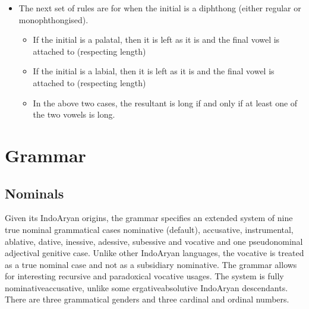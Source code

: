 \documentclass[14pt,oneside]{book}
\let\b\undefined
\newcommand{\b}[1]{{\brahmifont #1}}
\begin{document}
\begin{itemize}
\begin{itemize}
        \end{itemize}

    \item The next set of rules are for when the initial is a diphthong (either regular or monophthongised).

        \begin{itemize}
            
            \item If the initial is a palatal, then it is left as it is and the final vowel is attached to \b{𑀬𑁆} (respecting length)

            \item If the initial is a labial, then it is left as it is and the final vowel is attached to \b{𑀯𑁆} (respecting length)

            \item In the above two cases, the resultant is long if and only if at least one of the two vowels is long.

        \end{itemize}


\end{itemize}












\chapter{Grammar}

\section{Nominals}


Given its Indo{\textendash}Aryan origins, the grammar specifies an extended system of nine true nominal grammatical cases {\textemdash} nominative (default), accusative, instrumental, ablative, dative, inessive, adessive, subessive and vocative {\textemdash} and one pseudo{\textendash}nominal adjectival genitive case. Unlike other Indo{\textendash}Aryan languages, the vocative is treated as a true nominal case and not as a subsidiary nominative. The grammar allows for interesting recursive and paradoxical vocative usages. The system is fully nominative{\textendash}accusative, unlike some ergative{\textendash}absolutive Indo{\textendash}Aryan descendants. There are three grammatical genders and three cardinal and ordinal numbers.
\end{document}
